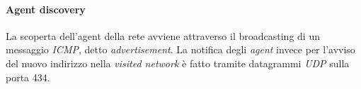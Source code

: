 \paragraph{Agent discovery}
La scoperta dell'agent della rete avviene attraverso il broadcasting di un messaggio \textit{ICMP}, detto \textit{advertisement}. La notifica degli \textit{agent} invece per l'avviso del nuovo indirizzo nella \textit{visited network} è fatto tramite datagrammi \textit{UDP} sulla porta 434.